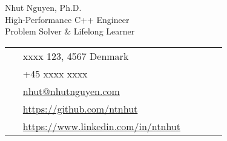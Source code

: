 \documentclass[11pt]{article} %
\begin{document}
\begin{paracol}{2}


\parbox[top][0.12\textheight][c]{\linewidth}{ %
	\vspace{-0.04\textheight} %
	\centering %
	{\sffamily\Huge Nhut Nguyen, Ph.D.}\\\medskip %
    \centering
    {\sffamily High-Performance C++ Engineer}\\
	\centering
    {\sffamily Problem Solver \& Lifelong Learner}
}

\switchcolumn %

\parbox[top][0.12\textheight][c]{\linewidth}{ %
	\vspace{-0.04\textheight} %
	\colorbox{shade}{ %
		\begin{supertabular}{p{0.05\linewidth}|p{0.775\linewidth}} %
			\raisebox{-1pt}{\faHome} & xxxx 123, 4567 Denmark  \\ %
			\raisebox{-1pt}{\faPhone} & +45 xxxx xxxx \\ %
			\raisebox{0pt}{\small\faEnvelope} & \href{mailto:nhut@nhutnguyen.com}{nhut@nhutnguyen.com} \\ %
			\raisebox{-1pt}{\faGithub} & \href{https://github.com/ntnhut}{https://github.com/ntnhut} \\ %
			\raisebox{-1pt}{\faLinkedinSquare} & \href{https://www.linkedin.com/in/ntnhut}{https://www.linkedin.com/in/ntnhut} \\ %
		\end{supertabular}
	}
}


\end{paracol}
\end{document}
